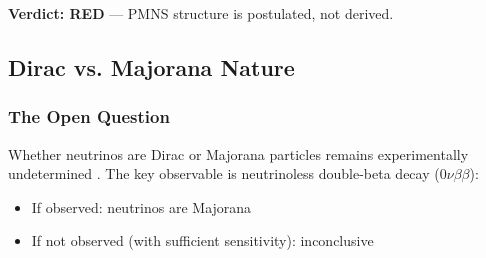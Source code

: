 \textbf{Verdict: RED} --- PMNS structure is postulated, not derived.













\subsection{Dirac vs. Majorana Nature}
\label{sec:ch6_dirac_majorana}

\subsubsection{The Open Question}

Whether neutrinos are Dirac or Majorana particles remains experimentally
undetermined \tagBL{}. The key observable is neutrinoless double-beta decay
($0\nu\beta\beta$):
\begin{itemize}[nosep]
    \item If observed: neutrinos are Majorana
    \item If not observed (with sufficient sensitivity): inconclusive
\end{itemize}

